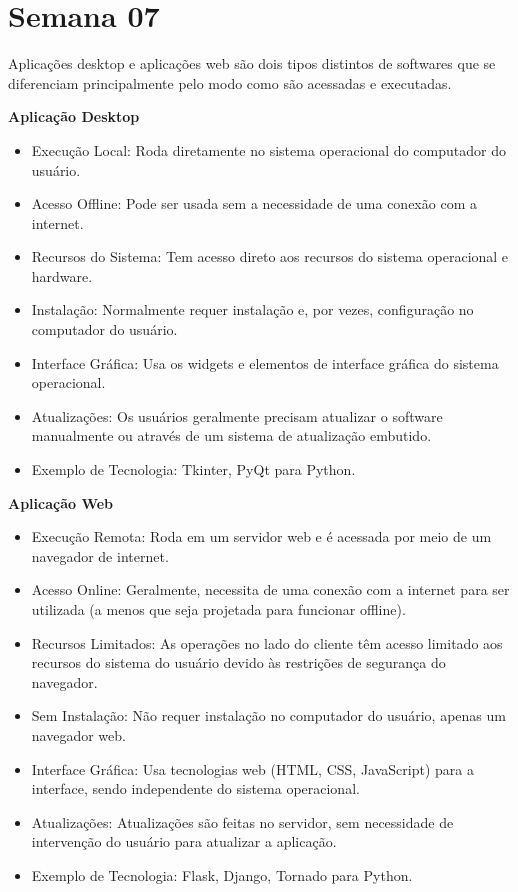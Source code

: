 \section{Semana 07}


Aplicações desktop e aplicações web são dois tipos distintos de softwares que se diferenciam principalmente pelo modo como são acessadas e executadas.

\textbf{Aplicação Desktop}
\begin{itemize}
    \item Execução Local: Roda diretamente no sistema operacional do computador do usuário.
    \item Acesso Offline: Pode ser usada sem a necessidade de uma conexão com a internet.
    \item Recursos do Sistema: Tem acesso direto aos recursos do sistema operacional e hardware.
    \item Instalação: Normalmente requer instalação e, por vezes, configuração no computador do usuário.
    \item Interface Gráfica: Usa os widgets e elementos de interface gráfica do sistema operacional.
    \item Atualizações: Os usuários geralmente precisam atualizar o software manualmente ou através de um sistema de atualização embutido.
    \item Exemplo de Tecnologia: Tkinter, PyQt para Python.
\end{itemize}

\textbf{Aplicação Web}
\begin{itemize}
    \item Execução Remota: Roda em um servidor web e é acessada por meio de um navegador de internet.
    \item Acesso Online: Geralmente, necessita de uma conexão com a internet para ser utilizada (a menos que seja projetada para funcionar offline).
    \item Recursos Limitados: As operações no lado do cliente têm acesso limitado aos recursos do sistema do usuário devido às restrições de segurança do navegador.
    \item Sem Instalação: Não requer instalação no computador do usuário, apenas um navegador web.
    \item Interface Gráfica: Usa tecnologias web (HTML, CSS, JavaScript) para a interface, sendo independente do sistema operacional.
    \item Atualizações: Atualizações são feitas no servidor, sem necessidade de intervenção do usuário para atualizar a aplicação.
    \item Exemplo de Tecnologia: Flask, Django, Tornado para Python.
\end{itemize}

